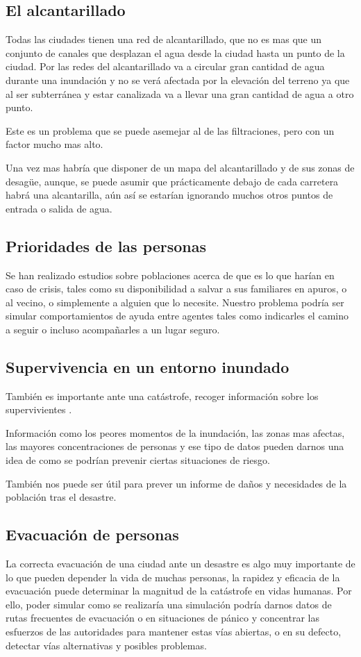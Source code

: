 \subsection*{El alcantarillado}
Todas las ciudades tienen una red de alcantarillado, que no es mas que un
conjunto de canales que desplazan el agua desde la ciudad hasta un punto de la
ciudad. Por las redes del alcantarillado va a circular gran cantidad de agua
durante una inundación y no se verá afectada por la elevación del terreno ya
que al ser subterránea y estar canalizada va a llevar una gran cantidad de agua
a otro punto.

Este es un problema que se puede asemejar al de las filtraciones, pero con un
factor mucho mas alto.

Una vez mas habría que disponer de un mapa del alcantarillado y de sus zonas de
desagüe, aunque, se puede asumir que prácticamente debajo de cada carretera
habrá una alcantarilla, aún así se estarían ignorando muchos otros puntos de
entrada o salida de agua.

\subsection*{Prioridades de las personas}

Se han realizado estudios \cite{prioridades} sobre poblaciones acerca de que es
lo que harían en caso de crisis, tales como su disponibilidad a salvar a sus
familiares en apuros, o al vecino, o simplemente a alguien que lo necesite.
Nuestro problema podría ser simular comportamientos de ayuda entre agentes
tales como indicarles el camino a seguir o incluso acompañarles a un lugar
seguro.

\subsection*{Supervivencia en un entorno inundado}

También es importante ante una catástrofe, recoger información sobre los
supervivientes \cite{survey}.

Información como los peores momentos de la inundación, las zonas mas afectas,
las mayores concentraciones de personas y ese tipo de datos pueden darnos una
idea de como se podrían prevenir ciertas situaciones de riesgo.

También nos puede ser útil para prever un informe de daños y necesidades de la
población tras el desastre.

\subsection*{Evacuación de personas}
La correcta evacuación de una ciudad ante un desastre es algo muy importante de
lo que pueden depender la vida de muchas personas, la rapidez y eficacia de la
evacuación puede determinar la magnitud de la catástrofe en vidas humanas. Por
ello, poder simular como se realizaría una simulación podría darnos datos de
rutas frecuentes de evacuación \cite{evac08} o en situaciones de pánico
\cite{panicevac} y concentrar las esfuerzos de las autoridades para mantener
estas vías abiertas, o en su defecto, detectar vías alternativas y posibles
problemas.

